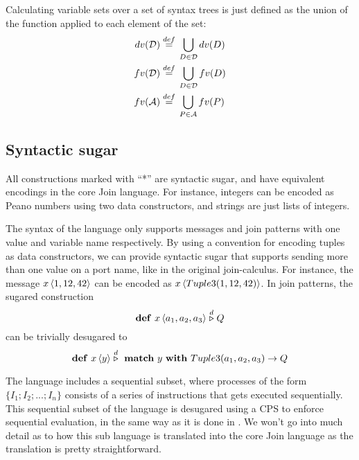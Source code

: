 Calculating variable sets over a set of syntax trees is just defined as the
union of the function applied to each element of the set:
\begin{align*}
 dv(\mathcal{D}) \stackrel{def}{=}{}& \bigcup_{D \in \mathcal{D}} dv(D) \\
 fv(\mathcal{D}) \stackrel{def}{=}{}& \bigcup_{D \in \mathcal{D}} fv(D) \\
 fv(\mathcal{A}) \stackrel{def}{=}{}& \bigcup_{P \in \mathcal{A}} fv(P)
\end{align*}

\subsection{Syntactic sugar}
All constructions marked with ``*'' are syntactic sugar, and have equivalent
encodings in the core Join language. For instance, integers can be encoded as
Peano numbers using two data constructors, and strings are just lists of
integers.

The syntax of the language only supports messages and join patterns with one
value and variable name respectively. By using a convention for encoding tuples
as data constructors, we can provide syntactic sugar that supports sending more
than one value on a port name, like in the original join-calculus. For instance,
the message $\atm x<1, 12, 42>$ can be encoded as $\atm x<Tuple3(1, 12, 42)>$. In
join patterns, the sugared construction
\begin{equation*}
 \mathbf{def}~\atm x<a_1, a_2, a_3> \stackrel{d}{\triangleright} Q
\end{equation*}
can be trivially desugared to
\begin{equation*}
 \mathbf{def}~\atm x<y> \stackrel{d}{\triangleright} ~\mathbf{match}~ y
 ~\mathbf{with}~ Tuple3(a_1,a_2,a_3) \rightarrow Q
\end{equation*}

The language includes a sequential subset, where processes of the form $\{ I_1;
I_2;...;I_n\}$ consists of a series of instructions that gets executed
sequentially. This sequential subset of the language is desugared using a CPS to
enforce sequential evaluation, in the same way as it is done in
\cite{fournet1996reflexive}. We won't go into much detail as to how this sub
language is translated into the core Join language as the translation is pretty
straightforward.


